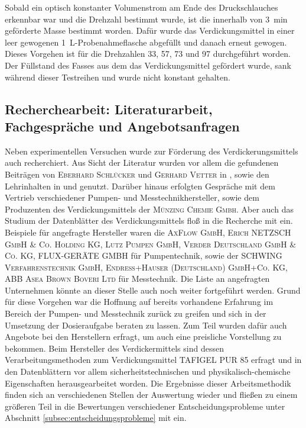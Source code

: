 Sobald ein optisch konstanter Volumenstrom am Ende des Druckschlauches erkennbar war und die Drehzahl bestimmt wurde, ist die innerhalb von \SI{3}{\minute} geförderte Masse bestimmt worden. Dafür wurde das Verdickungsmittel in einer leer gewogenen \SI{1}{\liter}-Probenahmeflasche abgefüllt und danach erneut gewogen. Dieses Vorgehen ist für die Drehzahlen 33, 57, 73 und \SI{97}{\rpm} durchgeführt worden. Der Füllstand des Fasses aus dem das Verdickungsmittel gefördert wurde, sank während dieser Testreihen und wurde nicht konstant gehalten. 

\subsection{Recherchearbeit: Literaturarbeit, Fachgespräche und Angebotsanfragen}
Neben experimentellen Versuchen wurde zur Förderung des Verdickerungsmittels auch recherchiert. Aus Sicht der Literatur wurden vor allem die  gefundenen Beiträgen von \textsc{Eberhard Schlücker} und \textsc{Gerhard Vetter} in \cite{Vetter.2002}, sowie den Lehrinhalten in \cite{Ignatowitz.2015} und \cite{Bierwerth.2019} genutzt. Darüber hinaus erfolgten Gespräche mit dem Vertrieb verschiedener Pumpen- und Messtechnikhersteller, sowie dem Produzenten des Verdickungsmittels der \textsc{Münzing Chemie Gmbh}. Aber auch das Studium der Datenblätter des Verdickungsmittels floß in die Recherche mit ein. \linebreak 
Beispiele für angefragte Hersteller waren die \textsc{AxFlow GmbH, Erich NETZSCH GmbH \& Co. Holding KG, Lutz Pumpen GmbH, Verder Deutschland GmbH \& Co. KG, FLUX-GERÄTE GMBH} für Pumpentechnik, sowie der \textsc{SCHWING Verfahrenstechnik GmbH, Endress+Hauser (Deutschland) GmbH+Co. KG, ABB Asea Brown Boveri Ltd} für Messtechnik. Die Liste an angefragten Unternehmen könnte an dieser Stelle auch noch weiter fortgeführt werden. Grund für diese Vorgehen war die Hoffnung auf bereits vorhandene Erfahrung im Bereich der Pumpen- und Messtechnik zurück zu greifen und sich in der Umsetzung der Dosieraufgabe beraten zu lassen. Zum Teil wurden dafür auch Angebote bei den Herstellern erfragt, um auch eine preisliche Vorstellung zu bekommen. \linebreak
Beim Hersteller des Verdickermittels sind dessen Verarbeitungsmethoden zum Verdickungsmittel TAFIGEL PUR 85 erfragt und in den Datenblättern vor allem sicherheitstechnischen und physikalisch-chemische Eigenschaften herausgearbeitet worden.\linebreak
Die Ergebnisse dieser Arbeitsmethodik finden sich an verschiedenen Stellen der Auswertung wieder und fließen zu einem größeren Teil in die Bewertungen verschiedener Entscheidungsprobleme unter Abschnitt \ref{subsec:entscheidungsprobleme} mit ein.

